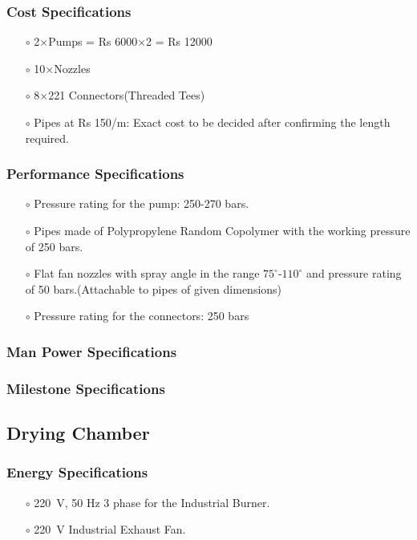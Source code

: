 \subsubsection{Cost Specifications}
\begin{itemize}
    \item[$\scriptstyle\circ$] 2$\times$Pumps = Rs 6000$\times$2 = Rs 12000
    \item[$\scriptstyle\circ$] 10$\times$Nozzles
    \item[$\scriptstyle\circ$] 8$\times$221 Connectors(Threaded Tees)
    \item[$\scriptstyle\circ$] Pipes at Rs 150/m: Exact cost to be decided after confirming the length required.
\end{itemize}

\subsubsection{Performance Specifications}
\begin{itemize}
    \item[$\scriptstyle\circ$] Pressure rating for the pump: 250-270 bars.
    \item[$\scriptstyle\circ$] Pipes made of \Gls{Polypropylene Random Copolymer} with the working pressure of 250 bars.
    \item[$\scriptstyle\circ$] Flat fan nozzles with spray angle in the range $75^\circ$-$110^\circ$ and pressure rating of 50 bars.(Attachable to pipes of given dimensions)
    \item[$\scriptstyle\circ$] Pressure rating for the connectors: 250 bars \cite{noauthor_thermoplastic_nodate}
\end{itemize}

\subsubsection{Man Power Specifications}

\subsubsection{Milestone Specifications}
\subsection{Drying Chamber}
\subsubsection{Energy Specifications}
\begin{itemize}
    \item[$\scriptstyle\circ$]\SI{220}{\volt}, 50 Hz 3 phase for the Industrial Burner.
    \item[$\scriptstyle\circ$] \SI{220}{\volt} Industrial Exhaust Fan.
\end{itemize}
